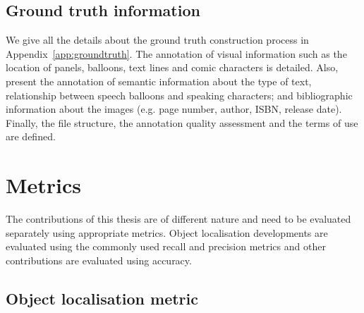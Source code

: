 
\subsection{Ground truth information} %
\label{sub:ground_truth}

We give all the details about the ground truth construction process in Appendix~\ref{app:groundtruth}.
The annotation of visual information such as the location of panels, balloons, text lines and comic characters is detailed.
Also, present the annotation of semantic information about the type of text, relationship between speech balloons and speaking characters; and bibliographic information about the images (e.g. page number, author, ISBN, release date).
Finally, the file structure, the annotation quality assessment and the terms of use are defined.






\section{Metrics} %
\label{sec:ex:metrics}
The contributions of this thesis are of different nature and need to be evaluated separately using appropriate metrics.
Object localisation developments are evaluated using the commonly used recall and precision metrics and other contributions are evaluated using accuracy.

\subsection{Object localisation metric} %
\label{sub:ex:object_localisation_metric}


